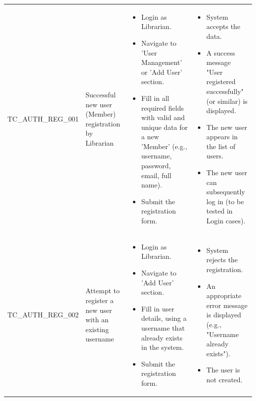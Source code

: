 \documentclass[10pt, a4paper]{report}
\begin{document}
\begin{longtable}{|>{\raggedright\arraybackslash}p{4cm}|>{\raggedright\arraybackslash}p{4cm}|>{\raggedright\arraybackslash}p{5cm}|>{\raggedright\arraybackslash}p{5cm}|}
\multicolumn{4}{|l|}{\textbf{Sub-Section: User Registration (by Librarian)}} \\ \hline
TC\_AUTH\_REG\_001 & Successful new user (Member) registration by Librarian & 
    \begin{itemize}[noitemsep, topsep=0pt, partopsep=0pt, leftmargin=*]
        \item Login as Librarian.
        \item Navigate to 'User Management' or 'Add User' section.
        \item Fill in all required fields with valid and unique data for a new 'Member' (e.g., username, password, email, full name).
        \item Submit the registration form.
    \end{itemize} & 
    \begin{itemize}[noitemsep, topsep=0pt, partopsep=0pt, leftmargin=*]
        \item System accepts the data.
        \item A success message "User registered successfully" (or similar) is displayed.
        \item The new user appears in the list of users.
        \item The new user can subsequently log in (to be tested in Login cases).
    \end{itemize} \\ \hline
TC\_AUTH\_REG\_002 & Attempt to register a new user with an existing username & 
    \begin{itemize}[noitemsep, topsep=0pt, partopsep=0pt, leftmargin=*]
        \item Login as Librarian.
        \item Navigate to 'Add User' section.
        \item Fill in user details, using a username that already exists in the system.
        \item Submit the registration form.
    \end{itemize} & 
    \begin{itemize}[noitemsep, topsep=0pt, partopsep=0pt, leftmargin=*]
        \item System rejects the registration.
        \item An appropriate error message is displayed (e.g., "Username already exists").
        \item The user is not created.
    \end{itemize} \\ \hline

\end{longtable}
\end{document}
